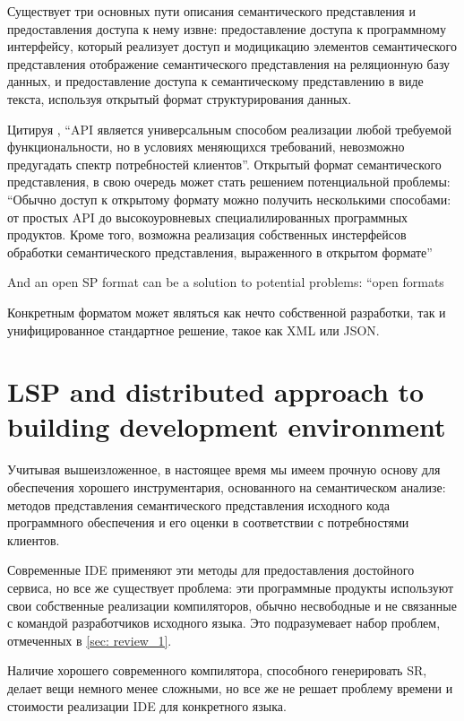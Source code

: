 Существует три основных пути описания семантического представления и предоставления доступа к нему извне:
предоставление доступа к программному интерфейсу, который реализует доступ и модицикацию элементов семантического представления\cite{Cannon, FreeSoftwareFoundation2016}
отображение семантического представления на реляционную базу данных\cite{Linton1983},
и предоставление доступа к семантическому представлению в виде текста, используя открытый формат структурирования данных\cite{TheRustTeam2016}.

Цитируя \cite{Zouev2005}, ``API является универсальным способом реализации любой требуемой функциональности, 
но в условиях меняющихся требований, невозможно предугадать спектр потребностей клиентов''.
Открытый формат семантического представления, в свою очередь может стать решением потенциальной проблемы: ``Обычно доступ к открытому формату можно получить несколькими способами:
от простых API до высокоуровневых специалилированных программных продуктов. Кроме того, возможна реализация собственных инстерфейсов обработки семантического представления, выраженного в открытом формате''

And an open SP format can be a solution to potential problems: ``open formats

Конкретным форматом может являться как нечто собственной разработки, так и унифицированное стандартное решение, 
такое как XML\cite{Germon} или JSON\cite{ECMA-4042013}.

\newpage
\section{LSP and distributed approach to building development environment}
\label{sec:review_3}
Учитывая вышеизложенное, в настоящее время мы имеем прочную основу для обеспечения хорошего инструментария, 
основанного на семантическом анализе: методов представления семантического представления исходного кода программного обеспечения 
и его оценки в соответствии с потребностями клиентов.

Современные IDE применяют эти методы для предоставления достойного сервиса, но все же существует проблема: 
эти программные продукты используют свои собственные реализации компиляторов, обычно несвободные и не связанные с командой разработчиков исходного языка. 
Это подразумевает набор проблем, отмеченных в \ref{sec: review_1}.

Наличие хорошего современного компилятора, способного генерировать SR, делает вещи немного менее сложными, 
но все же не решает проблему времени и стоимости реализации IDE для конкретного языка.


